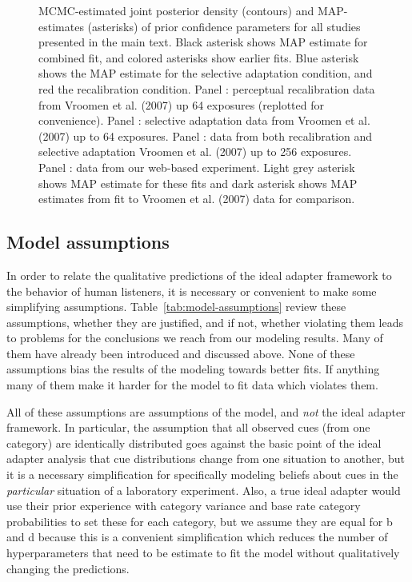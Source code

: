 \begin{figure}
{    \label{fig:conf-mturk}
  }
  \caption{MCMC-estimated joint posterior density (contours) and MAP-estimates (asterisks) of prior confidence parameters for all studies presented in the main text. Black asterisk shows MAP estimate for combined fit, and colored asterisks show earlier fits. Blue asterisk shows the MAP estimate for the selective adaptation condition, and red the recalibration condition. Panel : perceptual recalibration data from Vroomen et al. (2007) up 64 exposures (replotted for convenience). Panel : selective adaptation data from Vroomen et al. (2007) up to 64 exposures. Panel : data from both recalibration and selective adaptation Vroomen et al. (2007) up to 256 exposures. Panel : data from our web-based experiment. Light grey asterisk shows MAP estimate for these fits and dark asterisk shows MAP estimates from fit to Vroomen et al. (2007) data for comparison.}
  \label{fig:confidence-hyperparam-posteriors}
\end{figure}


\subsection{Model assumptions}
\label{sec:model-assumptions}

In order to relate the qualitative predictions of the ideal adapter framework to the behavior of human listeners, it is necessary or convenient to make some simplifying assumptions.  Table~\ref{tab:model-assumptions} review these assumptions, whether they are justified, and if not, whether violating them leads to problems for the conclusions we reach from our modeling results. Many of them have already been introduced and discussed above.  None of these assumptions bias the results of the modeling towards better fits.  If anything many of them make it harder for the model to fit data which violates them.

All of these assumptions are assumptions of the model, and \emph{not} the ideal adapter framework.  In particular, the assumption that all observed cues (from one category) are identically distributed goes against the basic point of the ideal adapter analysis that cue distributions change from one situation to another, but it is a necessary simplification for specifically modeling beliefs about cues in the \emph{particular} situation of a laboratory experiment.  Also, a true ideal adapter would use their prior experience with category variance and base rate category probabilities to set these for each category, but we assume they are equal for \ph b and \ph d because this is a convenient simplification which reduces the number of hyperparameters that need to be estimate to fit the model without qualitatively changing the predictions.


